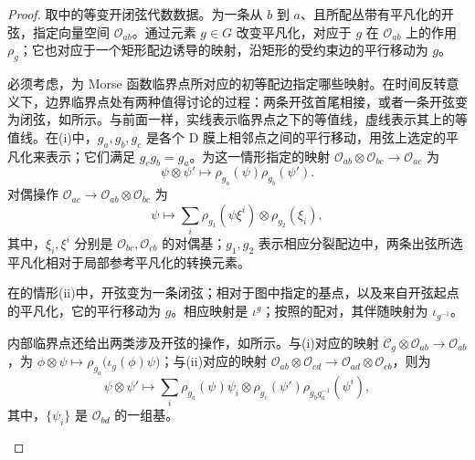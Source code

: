 \begin{proof}
取中的等变开闭弦代数数据。为一条从 $b$ 到 $a$、且所配丛带有平凡化的开弦，指定向量空间 $\mathcal{O}_{ab}$。通过元素 $g\in G$ 改变平凡化，对应于 $g$ 在 $\mathcal{O}_{ab}$ 上的作用 $\rho_g$；它也对应于一个矩形配边诱导的映射，沿矩形的受约束边的平行移动为 $g$。

必须考虑，为 Morse 函数临界点所对应的初等配边指定哪些映射。在时间反转意义下，边界临界点处有两种值得讨论的过程：两条开弦首尾相接，或者一条开弦变为闭弦，如所示。与前面一样，实线表示临界点之下的等值线，虚线表示其上的等值线。在(i)中，$g_a,g_b,g_c$ 是各个 D 膜上相邻点之间的平行移动，用弦上选定的平凡化来表示；它们满足 $g_cg_b=g_a$。为这一情形指定的映射 $\mathcal{O}_{ab}\otimes\mathcal{O}_{bc}\to\mathcal{O}_{ac}$ 为
\[
\psi\otimes\psi'\longmapsto\rho_{g_a}(\psi)\rho_{g_b}(\psi').
\]
对偶操作 $\mathcal{O}_{ac}\to\mathcal{O}_{ab}\otimes\mathcal{O}_{bc}$ 为
\[
\psi\longmapsto\sum_i\rho_{g_1}(\psi\xi^i)\otimes\rho_{g_2}(\xi_i),
\]
其中，$\xi_i,\xi^i$ 分别是 $\mathcal{O}_{bc},\mathcal{O}_{cb}$ 的对偶基；$g_1,g_2$ 表示相应分裂配边中，两条出弦所选平凡化相对于局部参考平凡化的转换元素。

\begin{figure}[H]
\centering
{}
\BookNumberOnlyCaption\label{fig:2.48}
\end{figure}

在的情形(ii)中，开弦变为一条闭弦；相对于图中指定的基点，以及来自开弦起点的平凡化，它的平行移动为 $g$。相应映射是 $\iota^g$；按照的配对，其伴随映射为 $\iota_{g^{-1}}$。

内部临界点还给出两类涉及开弦的操作，如所示。与(i)对应的映射 $\mathcal{C}_g\otimes\mathcal{O}_{ab}\to\mathcal{O}_{ab}$，为 $\phi\otimes\psi\mapsto\rho_{g_a}\bigl(\iota_g(\phi)\psi\bigr)$；与(ii)对应的映射 $\mathcal{O}_{ab}\otimes\mathcal{O}_{cd}\to\mathcal{O}_{ad}\otimes\mathcal{O}_{cb}$，则为
\[
\psi\otimes\psi'\longmapsto
\sum_i\rho_{g_a}(\psi)\psi_i\otimes\rho_{g_c}(\psi')\rho_{g_bg_a^{-1}}(\psi^i),
\]
其中，$\{\psi_i\}$ 是 $\mathcal{O}_{bd}$ 的一组基。

\begin{figure}[H]
\centering
{}
\BookNumberOnlyCaption\label{fig:2.49}
\end{figure}


\end{proof}
